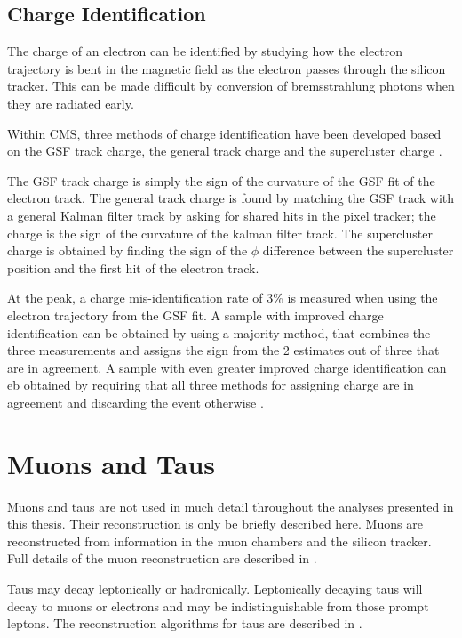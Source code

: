 \subsection{Charge Identification}
\label{sec:charge}
The charge of an electron can be identified by studying how the electron
trajectory is bent in the magnetic field as the electron passes through the
silicon tracker. This can be made difficult by conversion of bremsstrahlung
photons when they are radiated early.

Within CMS, three methods of charge identification have been developed based on
the {GSF} track charge, the general track charge and the supercluster charge
\cite{adam2009electron}. 

The {GSF} track charge is simply the sign of the curvature of the {GSF} fit of
the electron track.  The general track charge is found by matching the {GSF}
track with a general Kalman filter track by asking for shared hits in the pixel
tracker; the charge is the sign of the curvature of the kalman filter track.
The supercluster charge is obtained by finding the sign of the $\phi$ difference
between the supercluster position and the first hit of the electron track.

At the \PZ peak, a charge mis-identification rate of \unit{3}{\%}
\cite{adam2009electron} is measured when using the electron trajectory from the
{GSF} fit.  A sample with improved charge identification can be obtained by
using a majority method, that combines the three measurements and assigns the
sign from the 2 estimates out of three that are in agreement.  A sample with
even greater improved charge identification can eb obtained by requiring that
all three methods for assigning charge are in agreement and discarding the event
otherwise \cite{adam2009electron}.

\section{Muons and Taus}
Muons and taus are not used in much detail throughout the analyses presented in
this thesis. Their reconstruction is only be briefly described here.  Muons are
reconstructed from information in the muon chambers and the silicon tracker.
Full details of the muon reconstruction are described in
\cite{collaboration2010muon}.

Taus may decay leptonically or hadronically. Leptonically decaying taus will
decay to muons or electrons and may be indistinguishable from those prompt
leptons. The reconstruction algorithms for taus are described in
\cite{collaboration2012tau}.

